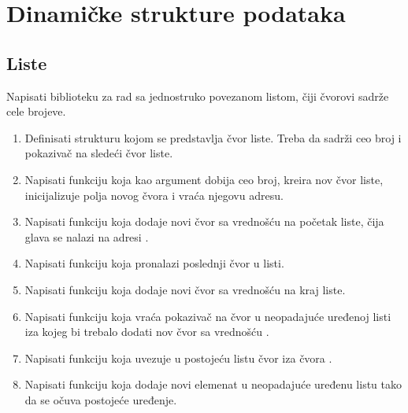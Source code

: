
\chapter{Dinamičke strukture podataka}

\section{Liste}

\begin{Exercise}[label=601]
Napisati biblioteku za rad sa jednostruko povezanom listom, čiji čvorovi sadrže cele brojeve. 
\begin{enumerate}
\item Definisati strukturu  kojom se predstavlja čvor liste. Treba da sadrži ceo broj  i pokazivač na sledeći čvor liste.

\item Napisati funkciju  koja kao argument dobija ceo broj, kreira nov čvor liste, inicijalizuje polja novog čvora i vraća njegovu adresu.

 \item Napisati funkciju  koja dodaje novi čvor sa vrednošću  na početak liste, čija glava se nalazi na adresi .

 \item Napisati funkciju  koja pronalazi poslednji čvor u listi.

 \item Napisati funkciju  koja dodaje novi čvor sa vrednošću  na kraj liste. 

 \item Napisati funkciju  koja vraća pokazivač na čvor u neopadajuće uređenoj listi iza kojeg bi trebalo dodati nov čvor sa vrednošću .

 \item Napisati funkciju  koja uvezuje u postojeću listu čvor  iza čvora .

 \item Napisati funkciju  koja dodaje novi elemenat u neopadajuće uređenu listu tako da se očuva postojeće uređenje.


\end{enumerate}
\end{Exercise}
